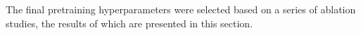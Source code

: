 \documentclass{article}
\begin{document}
The final pretraining hyperparameters were selected based on a series of ablation studies, the results of which are presented in this section.

\end{document}
